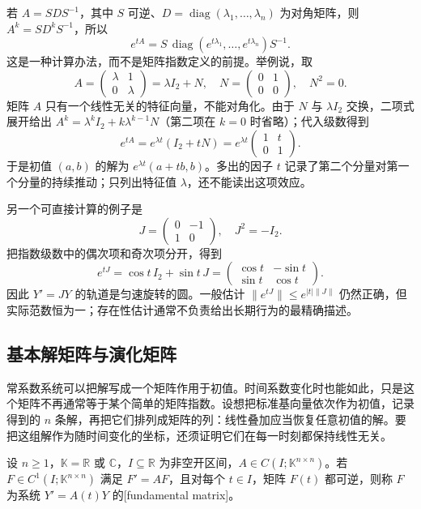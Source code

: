 若 \(A=SDS^{-1}\)，其中 \(S\) 可逆、\(D=\operatorname{diag}(\lambda_1,\ldots,\lambda_n)\) 为对角矩阵，则 \(A^k=SD^kS^{-1}\)，所以
\[
 e^{tA}=S\,\operatorname{diag}(e^{t\lambda_1},\ldots,e^{t\lambda_n})S^{-1}.
\]
这是一种计算办法，而不是矩阵指数定义的前提。举例说，取
\[
 A=\begin{pmatrix}\lambda&1\\0&\lambda\end{pmatrix}
 =\lambda I_2+N,\quad
 N=\begin{pmatrix}0&1\\0&0\end{pmatrix},\quad N^2=0.
\]
矩阵 \(A\) 只有一个线性无关的特征向量，不能对角化。由于 \(N\) 与 \(\lambda I_2\) 交换，二项式展开给出 \(A^k=\lambda^kI_2+k\lambda^{k-1}N\)（第二项在 \(k=0\) 时省略）；代入级数得到
\[
 e^{tA}=e^{\lambda t}(I_2+tN)
 =e^{\lambda t}\begin{pmatrix}1&t\\0&1\end{pmatrix}.
\]
于是初值 \((a,b)\) 的解为 \(e^{\lambda t}(a+tb,b)\)。多出的因子 \(t\) 记录了第二个分量对第一个分量的持续推动；只列出特征值 \(\lambda\)，还不能读出这项效应。

\ProseParagraphBreak

另一个可直接计算的例子是
\[
 J=\begin{pmatrix}0&-1\\1&0\end{pmatrix},\quad J^2=-I_2.
\]
把指数级数中的偶次项和奇次项分开，得到
\[
 e^{tJ}=\cos t\,I_2+\sin t\,J
 =\begin{pmatrix}\cos t&-\sin t\\\sin t&\cos t\end{pmatrix}.
\]
因此 \(Y'=JY\) 的轨道是匀速旋转的圆。一般估计 \(\|e^{tJ}\|\leq e^{|t|\|J\|}\) 仍然正确，但实际范数恒为一；存在性估计通常不负责给出长期行为的最精确描述。

\subsection{基本解矩阵与演化矩阵}
\label{b2:subsec:ode-fundamental-matrix}

常系数系统可以把解写成一个矩阵作用于初值。时间系数变化时也能如此，只是这个矩阵不再通常等于某个简单的矩阵指数。设想把标准基向量依次作为初值，记录得到的 \(n\) 条解，再把它们排列成矩阵的列：线性叠加应当恢复任意初值的解。要把这组解作为随时间变化的坐标，还须证明它们在每一时刻都保持线性无关。

\begin{definition}\label{b2:def:ode-fundamental-matrix}
设 \(n\geq1\)，\(\mathbb K=\mathbb R\) 或 \(\mathbb C\)，\(I\subseteq\mathbb R\) 为非空开区间，\(A\in C(I;\mathbb K^{n\times n})\)。若 \(F\in C^1(I;\mathbb K^{n\times n})\) 满足 \(F'=AF\)，且对每个 \(t\in I\)，矩阵 \(F(t)\) 都可逆，则称 \(F\) 为系统 \(Y'=A(t)Y\) 的[fundamental matrix]。
\end{definition}

